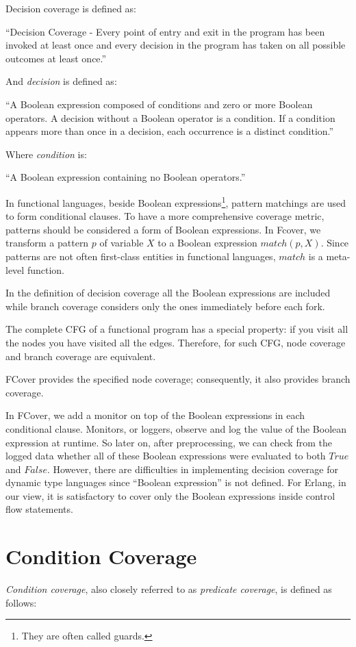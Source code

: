 \documentclass[12pt,a4paper]{report}
\begin{document}
Decision coverage is defined as:

``Decision Coverage - Every point of entry and exit in the program has been invoked at least once and every decision in the program has taken on all possible outcomes at least once.''\cite{cast-10}

And \emph{decision} is defined as:

``A Boolean expression composed of conditions and zero or more Boolean operators. A decision without a Boolean operator is a condition. If a condition appears more than once in a decision, each occurrence is a distinct condition.''\cite{cast-10}

Where \emph{condition} is:

``A Boolean expression containing no Boolean operators.''\cite{cast-10}

In functional languages, beside Boolean expressions\footnote{They are often called guards.}, pattern matchings are used to form conditional clauses. To have a more comprehensive coverage metric, patterns should be considered a form of Boolean expressions. In Fcover, we transform a pattern $p$ of variable $X$ to a Boolean expression $match(p,X)$. Since patterns are not often first-class entities in functional languages, $match$ is a meta-level function.

In the definition of decision coverage all the Boolean expressions are included while branch coverage considers only the ones immediately before each fork.

The complete CFG of a functional program has a special property: if you visit all the nodes you have visited all the edges. Therefore, for such CFG, node coverage and branch coverage are equivalent. 

FCover provides the specified node coverage; consequently, it also provides branch coverage.

In FCover, we add a monitor on top of the Boolean expressions in each conditional clause. Monitors, or loggers, observe and log the value of the Boolean expression at runtime. So later on, after preprocessing, we can check from the logged data whether all of these Boolean expressions were evaluated to both $True$ and $False$. However, there are difficulties in implementing decision coverage for dynamic type languages since ``Boolean expression'' is not defined. For Erlang, in our view, it is satisfactory to cover only the Boolean expressions inside control flow statements.

 
\section{Condition Coverage}
\emph{Condition coverage}, also closely referred to as \emph{predicate coverage}, is defined as follows:
\end{document}
